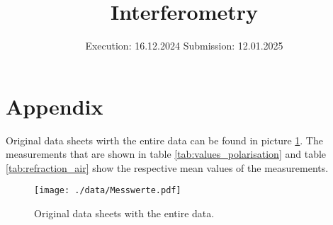 

\subject{v64}
\title{Interferometry}
\date{%
  Execution: 16.12.2024
  \hspace{3em}
  Submission: 12.01.2025
}



\maketitle
\thispagestyle{empty}
\tableofcontents
\newpage






\printbibliography{}

\appendix
\newpage

\section{Appendix}
\label{sec:appendix}

Original data sheets wirth the entire data can be found in picture \ref{fig:original_data}.
The measurements that are shown in table \ref{tab:values_polarisation} and table \ref{tab:refraction_air} show the respective mean values of the measurements.

\begin{figure}[H]
    \centering
    \texttt{[image: ./data/Messwerte.pdf]}
    \caption{Original data sheets with the entire data.}
    \label{fig:original_data}
\end{figure}



